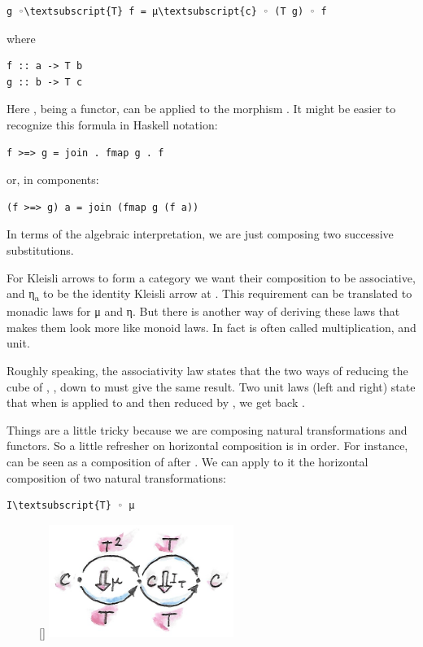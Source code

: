 \begin{Verbatim}[commandchars=\\\{\}]
g ◦\textsubscript{T} f = μ\textsubscript{c} ◦ (T g) ◦ f
\end{Verbatim}
where

\begin{verbatim}
f :: a -> T b
g :: b -> T c
\end{verbatim}
Here , being a functor, can be applied to the morphism
. It might be easier to recognize this formula in Haskell
notation:

\begin{verbatim}
f >=> g = join . fmap g . f
\end{verbatim}
or, in components:

\begin{verbatim}
(f >=> g) a = join (fmap g (f a))
\end{verbatim}
In terms of the algebraic interpretation, we are just composing two
successive substitutions.

For Kleisli arrows to form a category we want their composition to be
associative, and η\textsubscript{a} to be the identity Kleisli arrow at
. This requirement can be translated to monadic laws for μ and
η. But there is another way of deriving these laws that makes them look
more like monoid laws. In fact  is often called
multiplication, and  unit.

Roughly speaking, the associativity law states that the two ways of
reducing the cube of , , down to  must
give the same result. Two unit laws (left and right) state that when
 is applied to  and then reduced by , we
get back .

Things are a little tricky because we are composing natural
transformations and functors. So a little refresher on horizontal
composition is in order. For instance,  can be seen as a
composition of  after . We can apply to it the
horizontal composition of two natural transformations:

\begin{Verbatim}[commandchars=\\\{\}]
I\textsubscript{T} ◦ μ
\end{Verbatim}

\begin{figure}
\raisebox{0pt}[\dimexpr{}\baselineskip\relax]{
\includegraphics[width=60mm]{images/assoc1.png}}%
\end{figure}

